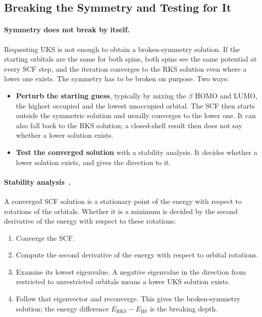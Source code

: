 
\subsection{Breaking the Symmetry and Testing for It}
\label{sec:background-stability}

\paragraph{Symmetry does not break by itself.} Requesting UKS is not
enough to obtain a broken-symmetry solution. If the starting orbitals are
the same for both spins, both spins see the same potential at every SCF
step, and the iteration converges to the RKS solution even where a lower
one exists. The symmetry has to be broken on purpose. Two ways:

\begin{itemize}
  \item \textbf{Perturb the starting guess}, typically by mixing the
    $\beta$ HOMO and LUMO, the highest occupied and the lowest
    unoccupied orbital. The SCF then starts outside the symmetric
    solution and usually converges to the lower one. It can also fall back
    to the RKS solution; a closed-shell result then does not say whether a
    lower solution exists.
  \item \textbf{Test the converged solution} with a stability analysis. It
    decides whether a lower solution exists, and gives the direction to
    it.
\end{itemize}

\paragraph{Stability analysis~\cite{cizek1967, seeger1977}.} A converged
SCF solution is a stationary point of the energy with respect to rotations
of the orbitals. Whether it is a minimum is decided by the second
derivative of the energy with respect to these rotations:

\begin{enumerate}
  \item Converge the SCF.
  \item Compute the second derivative of the energy with respect to
    orbital rotations.
  \item Examine its lowest eigenvalue. A negative eigenvalue in the
    direction from restricted to unrestricted orbitals means a lower UKS
    solution exists.
  \item Follow that eigenvector and reconverge. This gives the
    broken-symmetry solution; the energy difference
    $E_\mathrm{RKS} - E_\mathrm{BS}$ is the breaking depth.
\end{enumerate}

